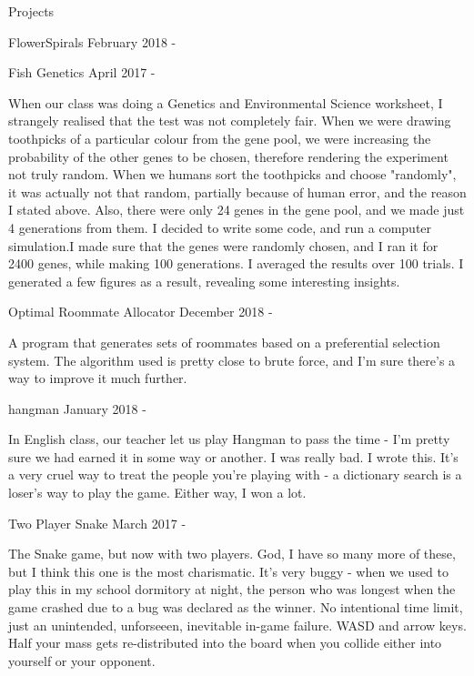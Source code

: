 \documentclass{resume} %
\begin{document}
\begin{rSection}{Projects}
\begin{rSubsection}{ FlowerSpirals }{ February 2018 -  }{}
\end{rSubsection}



\begin{rSubsection}{ Fish Genetics }{ April 2017 -  }{}
\item When our class was doing a Genetics and Environmental Science worksheet, I strangely realised that the test was not completely fair. When we were drawing toothpicks of a particular colour from the gene pool, we were increasing the probability of the other genes to be chosen, therefore rendering the experiment not truly random. When we humans sort the toothpicks and choose "randomly", it was actually not that random, partially because of human error, and the reason I stated above. Also, there were only 24 genes in the gene pool, and we made just 4 generations from them. I decided to write some code, and run a computer simulation.\n\n        I made sure that the genes were randomly chosen, and I ran it for 2400 genes, while making 100 generations. I averaged the results over 100 trials. I generated a few figures as a result, revealing some interesting insights.\n        

\end{rSubsection}



\begin{rSubsection}{ Optimal Roommate Allocator }{ December 2018 -  }{}
\item A program that generates sets of roommates based on a preferential selection system. The algorithm used is pretty close to brute force, and I'm sure there's a way to improve it much further.

\end{rSubsection}



\begin{rSubsection}{ hangman }{ January 2018 -  }{}
\item In English class, our teacher let us play Hangman to pass the time - I'm pretty sure we had earned it in some way or another. I was really bad. I wrote this. It's a very cruel way to treat the people you're playing with - a dictionary search is a loser's way to play the game. Either way, I won a lot.

\end{rSubsection}



\begin{rSubsection}{ Two Player Snake }{ March 2017 -  }{}
\item The Snake game, but now with two players. God, I have so many more of these, but I think this one is the most charismatic. It's very buggy - when we used to play this in my school dormitory at night, the person who was longest when the game crashed due to a bug was declared as the winner. No intentional time limit, just an unintended, unforseeen, inevitable in-game failure. WASD and arrow keys. Half your mass gets re-distributed into the board when you collide either into yourself or your opponent. 


\end{rSubsection}
\end{rSection}
\end{document}
